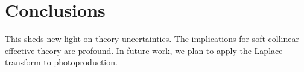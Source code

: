 \section{Conclusions}\label{sec:conclusions}

This sheds new light on theory uncertainties. The implications for
soft-collinear effective theory are profound. In future work, we plan to
apply the Laplace transform to photoproduction.

